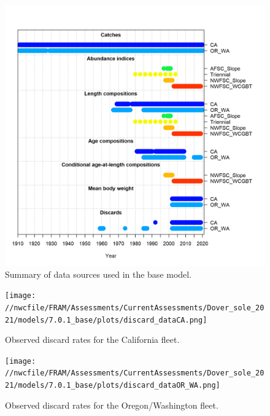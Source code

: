 \documentclass[11pt,
  english,
  a4paper,
]{article}
\begin{document}
\tagmcend\tagstructend


\begin{figure}
\centering
\includegraphics[width=1\textwidth,height=1\textheight]{figs/data_plot.png}
\caption{Summary of data sources used in the base model.\label{fig:data-plot}}
\end{figure}

\tagmcend\tagstructend


\begin{figure}
\centering
\texttt{[image: //nwcfile/FRAM/Assessments/CurrentAssessments/Dover\_sole\_2021/models/7.0.1\_base/plots/discard\_dataCA.png]}
\caption{Observed discard rates for the California fleet.\label{fig:ca-disc-ob}}
\end{figure}

\tagmcend\tagstructend


\begin{figure}
\centering
\texttt{[image: //nwcfile/FRAM/Assessments/CurrentAssessments/Dover\_sole\_2021/models/7.0.1\_base/plots/discard\_dataOR\_WA.png]}
\caption{Observed discard rates for the Oregon/Washington fleet.\label{fig:orwa-disc-ob}}
\end{figure}
\end{document}
